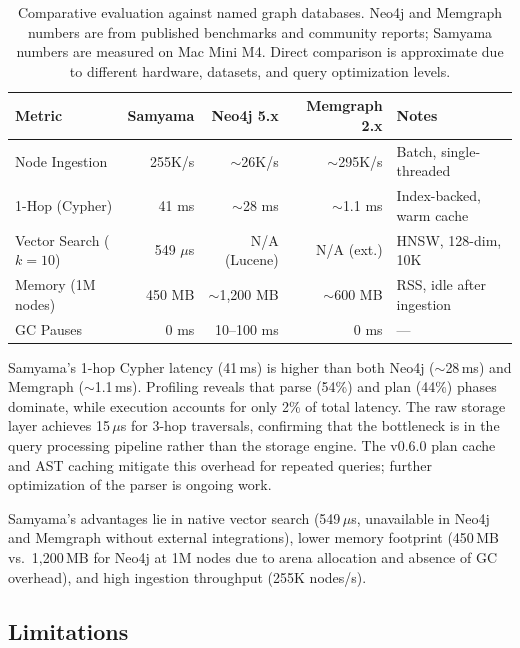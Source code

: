 \documentclass[11pt]{article}
\begin{document}
\begin{table}[H]
  \centering
  \caption{Comparative evaluation against named graph databases. Neo4j and Memgraph numbers are from published benchmarks and community reports; Samyama numbers are measured on Mac Mini M4. Direct comparison is approximate due to different hardware, datasets, and query optimization levels.}
  \label{tab:comparison}
  \begin{tabular}{@{}lrrrl@{}}
    \toprule
    \textbf{Metric} & \textbf{Samyama} & \textbf{Neo4j 5.x} & \textbf{Memgraph 2.x} & \textbf{Notes} \\
    \midrule
    Node Ingestion      & 255K/s          & ${\sim}$26K/s   & ${\sim}$295K/s & Batch, single-threaded \\
    1-Hop (Cypher)      & 41 ms           & ${\sim}$28 ms   & ${\sim}$1.1 ms & Index-backed, warm cache \\
    Vector Search ($k{=}10$) & 549 $\mu$s  & N/A (Lucene)    & N/A (ext.)     & HNSW, 128-dim, 10K \\
    Memory (1M nodes)   & 450 MB          & ${\sim}$1,200 MB& ${\sim}$600 MB & RSS, idle after ingestion \\
    GC Pauses           & 0 ms            & 10--100 ms      & 0 ms           & --- \\
    \bottomrule
  \end{tabular}
\end{table}

Samyama's 1-hop Cypher latency (41\,ms) is higher than both Neo4j (${\sim}$28\,ms) and Memgraph (${\sim}$1.1\,ms). Profiling reveals that parse (54\%) and plan (44\%) phases dominate, while execution accounts for only 2\% of total latency. The raw storage layer achieves 15\,$\mu$s for 3-hop traversals, confirming that the bottleneck is in the query processing pipeline rather than the storage engine. The v0.6.0 plan cache and AST caching mitigate this overhead for repeated queries; further optimization of the parser is ongoing work.

Samyama's advantages lie in native vector search (549\,$\mu$s, unavailable in Neo4j and Memgraph without external integrations), lower memory footprint (450\,MB vs.\ 1,200\,MB for Neo4j at 1M nodes due to arena allocation and absence of GC overhead), and high ingestion throughput (255K nodes/s).

\subsection{Limitations}
\label{sec:limitations}
\end{document}
